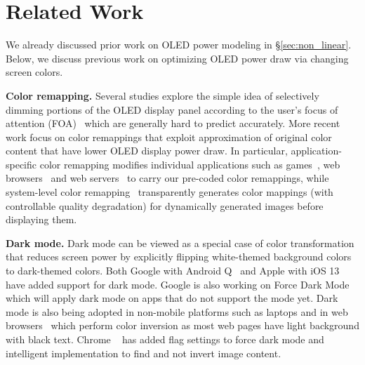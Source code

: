 \section{Related Work}
\label{sec:related}

We already discussed prior work on OLED power modeling in
\S\ref{sec:non_linear}. Below, we discuss previous work on optimizing
OLED power draw via changing screen colors.

{\bf Color remapping.}
Several studies explore the simple idea of selectively dimming portions
of the OLED display panel according to the user's focus of attention
(FOA)~\cite{tan:ubicom13,chen:hotpower14} which are generally hard to
predict accurately.
%
More recent work focus on color remappings that exploit
approximation of original color content that have lower OLED display
power draw. In particular, application-specific color remapping
modifies individual applications such as games~\cite{anand:mobisys11},
web browsers~\cite{dong:ispled09,li:esec15} and web
servers~\cite{li:icse2014} to carry our pre-coded color remappings,
while system-level color remapping~\cite{crayon:eurosys16}
transparently generates color mappings (with controllable
quality degradation) for dynamically generated images before
displaying them.

{\bf Dark mode.}
Dark mode can be viewed as a special case
of color transformation that reduces screen power
by explicitly flipping white-themed background colors to dark-themed colors.
Both Google with Android Q~\cite{darkmode:androidQ} and
Apple with iOS 13~\cite{darkmode:iOS13_1,darkmode:iOS13_2} have added support
for dark mode.  Google is also working on Force Dark
Mode~\cite{darkmode:forcedark} which will apply dark mode on apps
that do not support the mode yet.
%
Dark mode is also being adopted in non-mobile platforms such as
laptops and in web browsers~\cite{darkmode:web_browsers} which
perform color inversion as most web pages have light
background with black text.
Chrome ~\cite{darkmode:chrome} has added flag settings to force dark mode
and intelligent implementation to find and not invert image content.

